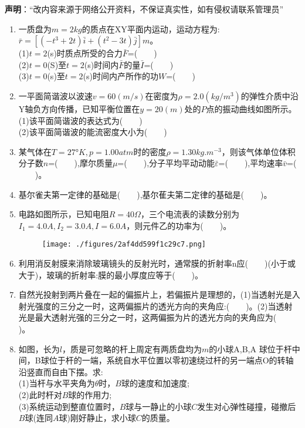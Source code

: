 
\textbf{声明}：“改内容来源于网络公开资料，不保证真实性，如有侵权请联系管理员”

\begin{enumerate}
\item 一质盘为$m=2kg$的质点在XY平面内运动，运动方程为:$\bar r =[(-t^3+2t)\bar i+(t^2-3t)\bar j]m$。\\
(1)$t=2$(s)时质点所受的合力$\bar F$=($\qquad$)\\
(2)$t=0$(S)至$t=2$(s)时间内$\bar F$的量$\bar I$=($\qquad$)\\
(3)$t=0$(s)至$t=2$(s)时间内产所作的功$W$=($\qquad$)
\item 一平面简谐波以波速$v=60(m/s)$在密度为$\rho=2.0(kg/m^3)$的弹性介质中沿Y轴负方向传播，已知平衡位置在$y=20(m)$处的$P$点的振动曲线如图所示。\\
(1)该平面简谐波的表达式为($\qquad$)\\
(2)该平面简谐波的能流密度大小为($\qquad$)
\item 某气体在$T=27$°$K,p=1.00atm$时的密度$\rho=1.30kg.m^{-3}$，则该气体单位体积分子数$n$=($\qquad$),摩尔质量$\mu$=($\qquad$),分子平均平动动能$\bar \varepsilon$=($\qquad$),平均速率$\bar v$=($\qquad$)。
\item 基尔雀夫第一定律的基础是($\qquad$),基尔萑夫第二定律的基础是($\qquad$)。
\item 电路如图所示，已知电阻$R=40\Omega$，三个电流表的读数分别为$I_1=4.0A,I_2=3.0A,I=6.0A$，则元件乙的功率为($\qquad$)。
\begin{figure}[ht]
\centering
\texttt{[image: ./figures/2af4dd599f1c29c7.png]}
\caption{} \label{fig_SD02_1}
\end{figure}
\item 利用消反射膜来消除玻璃镜头的反射光时，通常膜的折射率n应($\qquad$)(小于或大于)，玻璃的折射率:膜的最小厚度应等于($\qquad$)。
\item 自然光投射到两片叠在一起的偏振片上，若偏振片是理想的，(1)当透射光是入射光强度的三分之一时，这两偏振片的透光方向的夹角应:($\qquad$)。(2)当透射光是最大透射光强的三分之一时，这两偏振为片的透光方向的夹角应为($\qquad$)。
\item 如图，长为$l$，质是可忽略的杆上周定有两质盘均为$m$的小球A,B,A 球位于杆中间，B球位于杆的一端，系统自水平位置以零初速绕过杆的另一端点O的转轴沿竖直而自由下摆。求:\\
(1)当杆与水平夹角为$\theta$时，$B$球的速度和加速度;\\
(2)此时杆对$B$球的作用力;\\
(3)系统运动到整直位置时，$B$球与一静止的小球$C$发生对心弹性碰撞，碰撤后$B$球(连同$A$球)刚好静止，求小球$C$的质量。
\end{enumerate}
